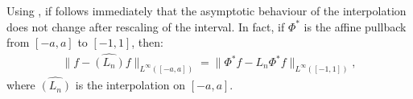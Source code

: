 \begin{problem}
\begin{subproblem}[4]
\begin{solution}
   Using , if follows immediately that the asymptotic behaviour of the interpolation does not change after rescaling of the interval. In fact, if $\Phi^*$ is the affine pullback from $[-a,a]$ to $[-1,1]$, then:
   \begin{align*}
     \lVert f - \hat{(L_n)} f \rVert_{L^\infty([-a,a])} = \lVert \Phi^* f - L_n \Phi^* f \rVert_{L^\infty([-1,1])},
   \end{align*}
   where $\hat{(L_n)}$ is the interpolation on $[-a,a]$.
 \end{solution}
 \end{subproblem}

\end{problem}
